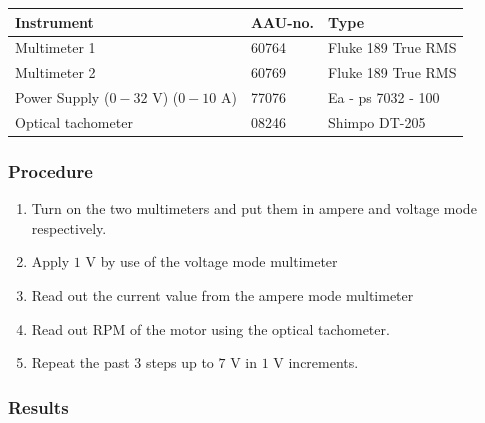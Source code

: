 \begin{table}[H]
\begin{tabular}{|l|l|p{4cm}|}
\hline%
  \textbf{Instrument}                        &  \textbf{AAU-no.}  &  \textbf{Type}       \\
\hline%
  Multimeter 1                               &  60764             &  Fluke 189 True RMS  \\
\hline%
  Multimeter 2                   		         &  60769             &  Fluke 189 True RMS  \\
\hline%
  Power Supply ($0 - 32$ V) ($0 - 10$ A)     &  77076             &  Ea - ps 7032 - 100  \\
\hline%
  Optical tachometer                         &  08246             &  Shimpo DT-205       \\
\hline%
\end{tabular}
\end{table}

\subsubsection{Procedure}

\begin{enumerate}
  \item Turn on the two multimeters and put them in ampere and voltage mode respectively.
  \item Apply $1$ V by use of the voltage mode multimeter
  \item Read out the current value from the ampere mode multimeter
  \item Read out RPM of the motor using the optical tachometer.
  \item Repeat the past $3$ steps up to $7$ V in $1$ V increments.
\end{enumerate}

\subsubsection{Results}

